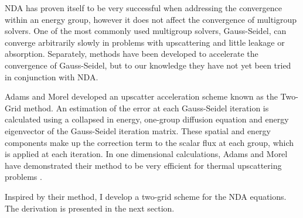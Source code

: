 NDA has proven itself to be very successful when addressing the convergence within an energy group, however it does not affect the convergence of multigroup solvers. One of the most commonly used multigroup solvers, Gauss-Seidel, can converge arbitrarily slowly in problems with upscattering and little leakage or absorption. Separately, methods have been developed to accelerate the convergence of Gauss-Seidel, but to our knowledge they have not yet been tried in conjunction with NDA. 

Adams and Morel developed an upscatter acceleration scheme known as the Two-Grid method. An estimation of the error at each Gauss-Seidel iteration is calculated using a collapsed in energy, one-group diffusion equation and energy eigenvector of the Gauss-Seidel iteration matrix. These spatial and energy components make up the correction term to the scalar flux at each group, which is applied at each iteration. In one dimensional calculations, Adams and Morel have demonstrated their method to be very efficient for thermal upscattering problems \cite{morel-upscat}.

Inspired by their method, I develop a two-grid scheme for the NDA equations. The derivation is presented in the next section. 